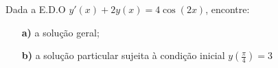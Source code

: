 \linespread{1.5}
Dada a E.D.O $y'(x) + 2y(x) = 4\cos{(2x)}$, encontre:
\begin{itemize}
    \item[\textbf{a)}] a solução geral;
    \item[\textbf{b)}] a solução particular sujeita à condição inicial $y(\frac{\pi}{4}) = 3$
\end{itemize}